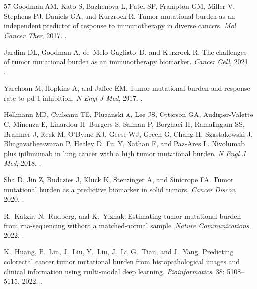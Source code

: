 \documentclass[11pt]{article}
\begin{document}
\begin{thebibliography}{57}
Goodman AM, Kato S, Bazhenova L, Patel SP, Frampton GM, Miller V, Stephens PJ,
  Daniels GA, and Kurzrock R.
\newblock Tumor mutational burden as an independent predictor of response to
  immunotherapy in diverse cancers.
\newblock \emph{Mol Cancer Ther}, 2017.
\newblock {}.

Jardim DL, Goodman A, de~Melo Gagliato~D, and Kurzrock R.
\newblock The challenges of tumor mutational burden as an immunotherapy
  biomarker.
\newblock \emph{Cancer Cell}, 2021.
\newblock {}.

Yarchoan M, Hopkins A, and Jaffee EM.
\newblock Tumor mutational burden and response rate to pd-1 inhibition.
\newblock \emph{N Engl J Med}, 2017.
\newblock {}.

Hellmann MD, Ciuleanu TE, Pluzanski A, Lee JS, Otterson GA, Audigier-Valette C,
  Minenza E, Linardou H, Burgers S, Salman P, Borghaei H, Ramalingam SS,
  Brahmer J, Reck M, O'Byrne KJ, Geese WJ, Green G, Chang H, Szustakowski J,
  Bhagavatheeswaran P, Healey D, Fu~Y, Nathan F, and Paz-Ares L.
\newblock Nivolumab plus ipilimumab in lung cancer with a high tumor mutational
  burden.
\newblock \emph{N Engl J Med}, 2018{}.
\newblock {}.

Sha D, Jin Z, Budczies J, Kluck K, Stenzinger A, and Sinicrope FA.
\newblock Tumor mutational burden as a predictive biomarker in solid tumors.
\newblock \emph{Cancer Discov}, 2020.
\newblock {}.

R.~Katzir, N.~Rudberg, and K.~Yizhak.
\newblock Estimating tumor mutational burden from rna-sequencing without a
  matched-normal sample.
\newblock \emph{Nature Communications}, 2022.
\newblock {}.

K.~Huang, B.~Lin, J.~Liu, Y.~Liu, J.~Li, G.~Tian, and J.~Yang.
\newblock Predicting colorectal cancer tumor mutational burden from
  histopathological images and clinical information using multi-modal deep
  learning.
\newblock \emph{Bioinformatics}, 38: 5108--5115, 2022.
\newblock {}.


\end{thebibliography}
\end{document}
